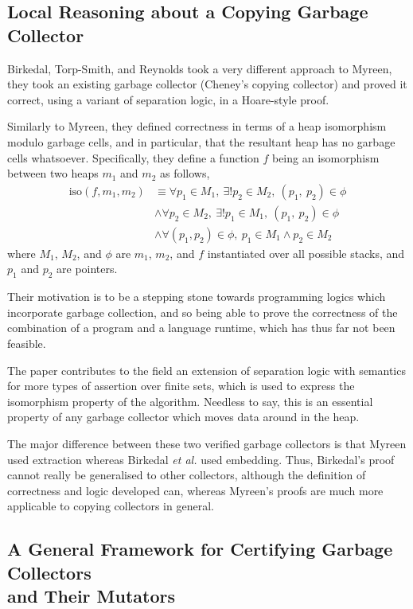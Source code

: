 \subsection{Local Reasoning about a Copying Garbage Collector}
\label{sec:lit-verifiedgc-birkedal}

Birkedal, Torp-Smith, and Reynolds\cite{Birkedal04} took a very
different approach to Myreen, they took an existing garbage collector
(Cheney's copying collector) and proved it correct, using a variant of
separation logic, in a Hoare-style proof.

Similarly to Myreen, they defined correctness in terms of a heap
isomorphism modulo garbage cells, and in particular, that the
resultant heap has no garbage cells whatsoever. Specifically, they
define a function $f$ being an isomorphism between two heaps $m_{1}$
and $m_{2}$ as follows,
\begin{align*}
  \textrm{iso}(f, m_{1}, m_{2})&\equiv \forall p_{1} \in M_{1},\
  \exists ! p_{2} \in M_{2},\ (p_{1},\ p_{2}) \in \phi\\
  &\land \forall p_{2} \in M_{2},\ \exists ! p_{1} \in M_{1},\
  (p_{1},\ p_{2}) \in \phi\\
  &\land \forall(p_{1}, p_{2}) \in \phi,\ p_{1} \in M_{1} \land p_{2}
  \in M_{2}
\end{align*}
where $M_{1}$, $M_{2}$, and $\phi$ are $m_{1}$, $m_{2}$, and $f$
instantiated over all possible stacks, and $p_{1}$ and $p_{2}$ are
pointers.

Their motivation is to be a stepping stone towards programming logics
which incorporate garbage collection, and so being able to prove the
correctness of the combination of a program and a language runtime,
which has thus far not been feasible.

The paper contributes to the field an extension of separation logic
with semantics for more types of assertion over finite sets, which is
used to express the isomorphism property of the algorithm. Needless to
say, this is an essential property of any garbage collector which
moves data around in the heap.

The major difference between these two verified garbage collectors is
that Myreen used extraction whereas Birkedal \textit{et al.} used
embedding. Thus, Birkedal's proof cannot really be generalised to
other collectors, although the definition of correctness and logic
developed can, whereas Myreen's proofs are much more applicable to
copying collectors in general.

\subsection{A General Framework for Certifying Garbage Collectors\\and Their Mutators}
\label{sec:lit-verifying-mccreight}

